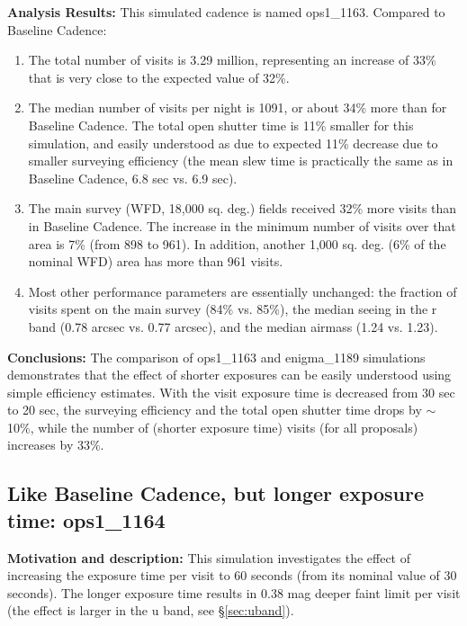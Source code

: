 \documentclass[manuscript]{article}
\begin{document}
{\bf Analysis Results:}  This simulated cadence is named ops1\_1163. Compared to Baseline Cadence:
\begin{enumerate}
\item The total number of visits is 3.29 million, representing an increase of 33\% that is very 
close to the expected value of 32\%.
\item The median number of visits per night is 1091, or about 34\% more than for Baseline Cadence. 
The total open shutter time is 11\% smaller for this simulation, and easily understood as due to 
expected 11\% decrease due to smaller surveying efficiency (the mean slew time is practically 
the same as in Baseline Cadence, 6.8 sec vs. 6.9 sec).
\item The main survey (WFD, 18,000 sq. deg.) fields received 32\% more visits than in Baseline Cadence. 
The increase in the minimum number of visits over that area is 7\% (from 898 to 961). In addition, 
another 1,000 sq. deg. (6\% of the nominal WFD) area has more than 961 visits.
\item Most other performance parameters are essentially unchanged: the fraction of visits spent 
on the main survey (84\% vs. 85\%), the median seeing in the r band (0.78 arcsec vs. 0.77 arcsec), 
and the median airmass (1.24 vs. 1.23).
\end{enumerate}

{\bf Conclusions:} 
The comparison of ops1\_1163 and enigma\_1189 simulations demonstrates
that the effect of shorter exposures can be easily understood using simple efficiency
estimates. With the visit exposure time is decreased from 30 sec to 20 sec, the surveying
efficiency and the total open shutter time drops by $\sim$10\%, while the number
of (shorter exposure time) visits (for all proposals) increases by 33\%. 





\subsection{Like Baseline Cadence, but longer exposure time: ops1\_1164} 


{\bf Motivation and description:} This simulation investigates the effect of increasing the 
exposure time per visit to 60 seconds (from its nominal value of 30 seconds). The longer 
exposure time results in 0.38 mag deeper faint limit per visit (the effect is larger in the 
u band, see \S\ref{sec:uband}). \\
\end{document}
